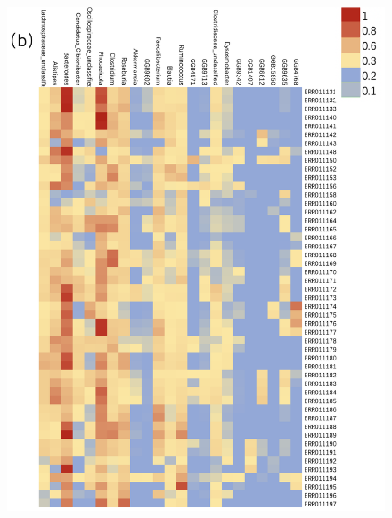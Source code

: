 \documentclass[12pt]{article}
\begin{document}
\begin{figure}[H]
    \centering
    \includegraphics[width=1\linewidth]{pic/heatingmapgenus.png}
\end{figure}
\end{document}
